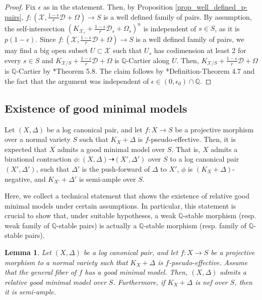 \documentclass{amsart}
\newcommand{\bQ}{\mathbb{Q}}
\newcommand{\cD}{\mathcal{D}}
\newcommand{\cX}{\mathcal{X}}
\newtheorem{Lemma}[theorem]{Lemma}
\theoremstyle{definition}
\newcommand{\rar}{\rightarrow}
\newcommand{\drar}{\dashrightarrow}
\def\K#1.{K_{#1}}
\renewcommand{\qq}{\mathbb{Q}}
\begin{document}
\begin{proof}
Fix $\epsilon$ as in the statement.
Then, by Proposition \ref{prop_well_defined_p-pairs}, $f \colon (\cX, \frac{1-\epsilon}{r}\cD + \Omega) \rar S$ is a well defined family of pairs.
By assumption, the self-intersection $(\K \cX_s. + \frac{1-\epsilon}{r}\cD_s + \Omega_s)^n$ is independent of $s \in S$, as it is $p(1-\epsilon)$.
Since $f \colon (\cX, \frac{1-\epsilon}{r}\cD + \Omega) \rar S$ is a well defined family of pairs, we may find a big open subset $U \subset \cX$ such that $U_s$ has codimension at least 2 for every $s \in S$ and $\K \cX/S. + \frac{1-\epsilon}{r}\cD + \Omega$ is $\qq$-Cartier along $U$.
Then, $\K \cX/S. + \frac{1-\epsilon}{r}\cD + \Omega$ is $\qq$-Cartier by \cite{kol_new}*{Theorem 5.8}.
The claim follows by \cite{kol_new}*{Definition-Theorem 4.7} and the fact that the argument was independent of $\epsilon \in (0,\epsilon_0) \cap \qq$.
\end{proof}


\subsection{Existence of good minimal models}
Let $(X,\Delta)$ be a log canonical pair, and let $f \colon X \rar S$ be a projective morphism over a normal variety $S$ such that $\K X. + \Delta$ is $f$-pseudo-effective.
Then, it is expected that $X$ admits a good minimal model over $S$.
That is, $X$ admits a birational contraction $\phi \colon (X,\Delta) \drar (X',\Delta')$ over $S$ to a log canonical pair $(X',\Delta')$, such that $\Delta'$ is the push-forward of $\Delta$ to $X'$, $\phi$ is $(K_X+\Delta)$-negative, and $\K X'. + \Delta'$ is semi-ample over $S$.

Here, we collect a technical statement that shows the existence of relative good minimal models under certain assumptions.
In particular, this statement is crucial to show that, under suitable hypotheses, a weak $\bQ$-stable morphism (resp. weak family of $\bQ$-stable pairs) is actually a $\bQ$-stable morphism (resp. family of $\bQ$-stable pairs).

\begin{Lemma} \label{lemma minimal models}
Let $(X,\Delta)$ be a log canonical pair, and let $f \colon X \rar S$ be a projective morphism to a normal variety such that $\K X. + \Delta$ is $f$-pseudo-effective.
Assume that the general fiber of $f$ has a good minimal model.
Then,
$(X,\Delta)$ admits a relative good minimal model over $S$.
Furthermore, if $\K X. + \Delta$ is nef over $S$, then it is semi-ample.
\end{Lemma}
\end{document}
